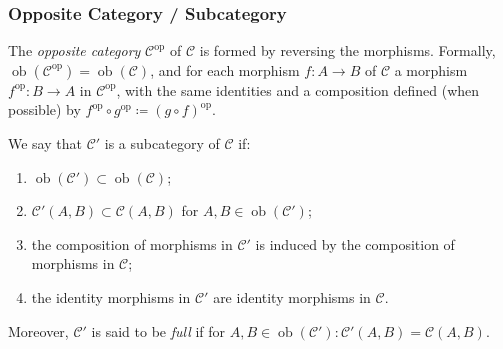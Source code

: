 \documentclass[UTF8,aspectratio=43,11pt,colorlinks,compress,openany]{beamer}%
\begin{document}
\begin{frame}\frametitle{Opposite Category / Subcategory}
\begin{definition}
The \emph{opposite category} $\mathcal{C}^\mathrm{op}$ of $\mathcal{C}$ is formed by reversing the morphisms. Formally, $\operatorname{ob}(\mathcal{C}^\mathrm{op})=
\operatorname{ob}(\mathcal{C})$, and for each morphism $f: A\to B$ of $\mathcal{C}$ a morphism $f^\mathrm{op}: B\to A$ in $\mathcal{C}^\mathrm{op}$, with the same identities and a composition defined (when possible) by $f^\mathrm{op}\circ g^\mathrm{op}\coloneqq (g\circ f)^\mathrm{op}$.
\end{definition}
\begin{definition}[Subcategory]
	We say that $\mathcal{C}'$ is a subcategory of $\mathcal{C}$ if:
	\begin{enumerate}
		\item $\operatorname{ob}(\mathcal{C}')\subset\operatorname{ob}(\mathcal{C})$;
		\item $\mathcal{C}'(A,B)\subset\mathcal{C}(A,B)$ for $A,B\in\operatorname{ob}(\mathcal{C}')$;
		\item the composition of morphisms in $\mathcal{C}'$ is induced by the composition of morphisms in $\mathcal{C}$;
		\item the identity morphisms in $\mathcal{C}'$ are identity morphisms in $\mathcal{C}$.
	\end{enumerate}
\end{definition}
Moreover, $\mathcal{C}'$ is said to be \emph{full} if for $A,B\in\operatorname{ob}(\mathcal{C}'):\mathcal{C}'(A,B)=\mathcal{C}(A,B)$.
\end{frame}
\end{document}
